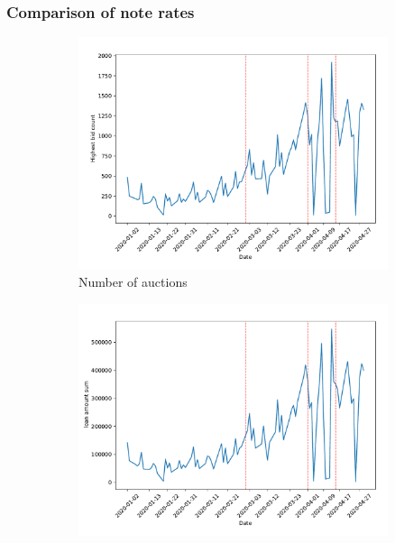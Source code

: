 \documentclass[11pt,a4paper]{article}
\begin{document}
\pagebreak
\subsubsection{Comparison of note rates}

\begin{figure}[h]
  \centering
  \begin{subfigure}[b]{0.49\textwidth}
      \includegraphics[width=0.998\textwidth]{../results/figures/winner_bid_count_mat30_loan1_timeseries_nr_3_3.75.pdf}
      \caption{ Number of auctions}
     \end{subfigure}
     \begin{subfigure}[b]{0.49\textwidth}
      \includegraphics[width=0.998\textwidth]{../results/figures/LoanAmount_sum_mat30_loan1_timeseries_nr_3_3.75.pdf}

\end{subfigure}
\end{figure}
\end{document}
